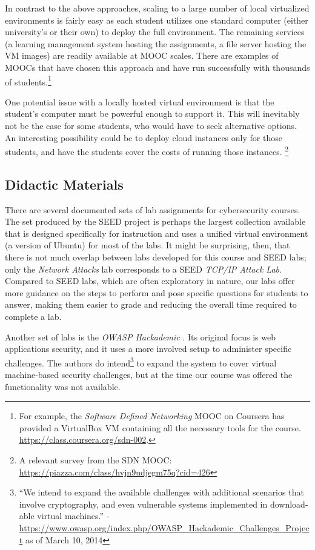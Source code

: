 \documentclass{sig-alternate-2013}
\begin{document}
In contrast to the above approaches, scaling to a large number of local virtualized environments is fairly easy as each student
utilizes one standard computer (either university's or their own) to deploy the full environment. The remaining services (a
learning management system hosting the assignments, a file server hosting the VM images) are readily available at MOOC scales.
There are examples of MOOCs that have chosen this approach and have
run successfully with thousands of students.\footnote{For example, the \emph{Software Defined Networking} MOOC on Coursera
has provided a VirtualBox VM containing all the necessary tools for the course. \\ \url{https://class.coursera.org/sdn-002}.}

One potential issue with a locally hosted virtual environment is that the student's computer must be powerful enough to support it. This will 
inevitably not be the case for some students, who would have to seek alternative options. An interesting possibility could be
to deploy cloud instances only for those students, and have the students cover the costs of running those instances. 
\footnote{A relevant survey from the SDN MOOC: \\ \url{https://piazza.com/class/hvjn9udjegm75q?cid=426}}

\subsection{Didactic Materials}
\label{sec:labassignments}

There are several documented sets of lab assignments for cybersecurity courses. The set produced by the SEED project \cite{seed11} is 
perhaps the largest collection available that is designed specifically for instruction and 
uses a unified virtual environment (a version of Ubuntu) for most of the labs. It might be surprising, 
then, that there is not much overlap
between labs developed for this course and SEED labs; only the \emph{Network Attacks} lab corresponds to a SEED
\emph{TCP/IP Attack Lab}. Compared to SEED labs, which are often exploratory in nature, our labs offer more guidance
on the steps to perform and pose specific questions for students to answer, making them easier to grade and reducing
the overall time required to complete a lab.

Another set of labs is the \emph{OWASP Hackademic} \cite{hackademic}. Its original focus is web applications
security, and it uses a more involved setup to administer specific challenges. The authors do intend\footnote{``We intend to 
expand the available challenges with additional scenarios that involve cryptography, and even vulnerable systems 
implemented in download-able virtual machines.'' - \url{https://www.owasp.org/index.php/OWASP_Hackademic_Challenges_Project}
as of March 10, 2014} to expand the system to cover virtual machine-based security challenges, but at the time our
course was offered the functionality was not available.
\end{document}
